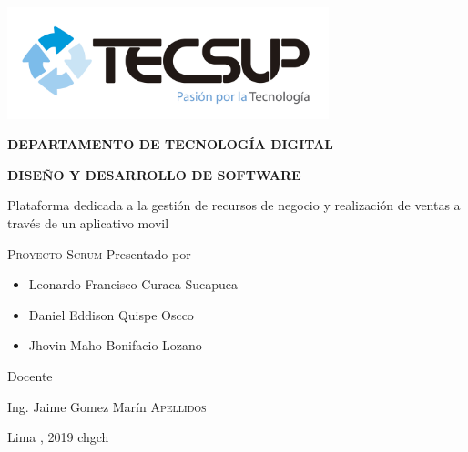 \begin{titlepage}
	\centering
	\includegraphics[width=0.70\textwidth]{img/logo_tecsup_final}\par\vspace{1cm}
	\vspace{0.30cm}	
	{\scshape\large\bfseries DEPARTAMENTO DE TECNOLOG\'IA DIGITAL \par}
	\vspace{0.60cm}	
	{\scshape\large\bfseries DISEÑO Y DESARROLLO DE SOFTWARE  \par}
	\vspace{2.00cm}		
	{\large\large Plataforma dedicada a la gestión de recursos de negocio y realización de ventas a través de un aplicativo movil \par}
	\vspace{0.60cm}
	{\scshape\large Proyecto Scrum }
	\vspace{0.60cm}
	\vfill
	Presentado por \par
	{\large\itshape { 
		\begin{itemize}
			\item Leonardo Francisco Curaca Sucapuca
			\item Daniel Eddison Quispe Oscco
			\item Jhovin Maho Bonifacio Lozano
		\end{itemize} 
	}\par}
	\vspace{0.30cm}
	\vfill
	Docente \par
	Ing. Jaime Gomez Marín  \textsc{ Apellidos}
	
  \vspace{0.30cm}
	\vfill
        {\large Lima , 2019 chgch \par}
\end{titlepage}

